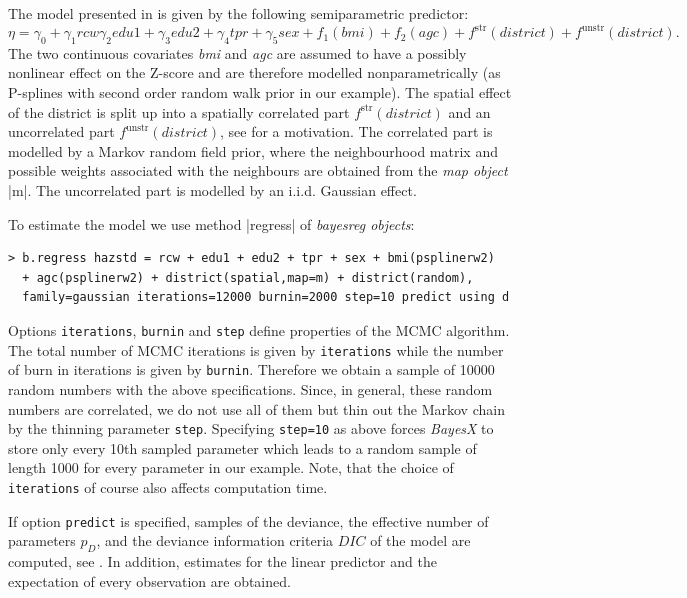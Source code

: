 The model presented in  is given by the following semiparametric predictor:
\[
 \eta=\gamma_0+\gamma_1\mathit{rcw}\gamma_2\mathit{edu1}+\gamma_3\mathit{edu2}+\gamma_4\mathit{tpr}+\gamma_5\mathit{sex}+
 f_1(\mathit{bmi})+f_2(\mathit{agc})+f^{\mathrm{str}}(\mathit{district})+f^{\mathrm{unstr}}(\mathit{district}).
\]
The two continuous covariates {\it bmi} and {\it agc} are assumed to have a possibly nonlinear effect on the Z-score and are
therefore modelled nonparametrically (as P-splines with second order random walk prior in our example). The spatial effect of
the district is split up into a spatially correlated part $f^{\mathrm{str}}(\mathit{district})$ and an uncorrelated part
$f^{\mathrm{unstr}}(\mathit{district})$, see  for a motivation. The correlated part is modelled by a
Markov random field prior, where the neighbourhood matrix and possible weights associated with the neighbours are obtained from
the {\it map object} |m|. The uncorrelated part is modelled by an  i.i.d. Gaussian effect.

To estimate the model we use method |regress| of {\it bayesreg objects}:
\begin{verbatim}
> b.regress hazstd = rcw + edu1 + edu2 + tpr + sex + bmi(psplinerw2)
  + agc(psplinerw2) + district(spatial,map=m) + district(random),
  family=gaussian iterations=12000 burnin=2000 step=10 predict using d
\end{verbatim}

Options {\tt iterations}, {\tt burnin} and {\tt step} define properties of the MCMC algorithm. The total number of MCMC
iterations is given by {\tt iterations} while the number of burn in iterations is given by {\tt burnin}. Therefore we obtain a
sample of 10000 random numbers with the above specifications. Since, in general, these random numbers are correlated, we do not
use all of them but thin out the Markov chain by the thinning parameter {\tt step}. Specifying {\tt step=10} as above forces
{\it BayesX} to store only every 10th sampled parameter which leads to a random sample of length 1000 for every parameter in
our example. Note, that the choice of {\tt iterations} of course also affects computation time.

If option {\tt predict} is specified, samples of the deviance, the effective number of parameters $p_D$, and the deviance
information criteria $DIC$ of the model are computed, see . In addition, estimates for the linear
predictor and the expectation of every observation are obtained.

